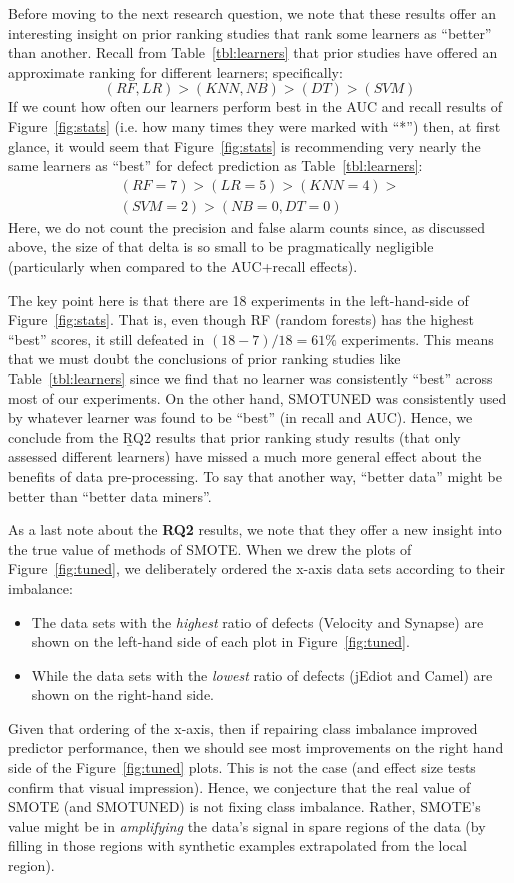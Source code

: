 \documentclass[10pt,conference]{IEEEtran}
\newcommand{\bi}{\begin{itemize}[leftmargin=0.4cm]}
\newcommand{\ei}{\end{itemize}}
\theoremstyle{break}
\theoremstyle{break}
\begin{document}
Before moving to the next research question, we note that these
 results offer an interesting insight on prior ranking studies that rank some learners
as ``better'' than another.
Recall from Table~\ref{tbl:learners} that prior studies have offered an approximate ranking for different learners; specifically:
\[
(\mathit{RF},\mathit{LR}) > (\mathit{KNN},\mathit{NB}) > (\mathit{DT}) > (\mathit{SVM})
\]
If we count how often our learners perform
best in the AUC and recall results of Figure~\ref{fig:stats} (i.e. how many times they were marked with ``*'') then, at first
glance, it would seem that Figure~\ref{fig:stats} is recommending very nearly the same
learners as ``best'' for defect prediction as   Table~\ref{tbl:learners}:
\[
\begin{array}{c}
(\mathit{RF}=7) > (\mathit{LR}=5) > (\mathit{KNN}=4) >\\
(\mathit{SVM}=2) > (\mathit{NB}=0, \mathit{DT}=0)
\end{array}
\]
Here, we do not count  the precision and false alarm counts since, as discussed above, the size
of that delta is so small to be pragmatically negligible (particularly when compared to the AUC+recall effects).

The key point here is that there are 18 experiments in the left-hand-side of Figure~\ref{fig:stats}. That is,
even though RF (random forests) has the highest  ``best'' scores, it still defeated in \mbox{$(18-7)/18=61\%$}
experiments. This means that we must doubt the conclusions of prior ranking studies like 
 Table~\ref{tbl:learners} since we find that no   learner was  consistently  ``best''  across most of our experiments.
On the other hand, 
  SMOTUNED was  consistently  used  by  whatever  learner  was  found  to  be ``best'' (in recall and AUC). 
Hence, we conclude from the {\b RQ2} results that  prior ranking study results (that only assessed different learners) have missed a much more general effect about the benefits of data pre-processing.
To say that another way, ``better data'' might be better than ``better data miners''.

As a last note about the {\bf RQ2} results, we note that they offer a new insight into
the true value of methods of SMOTE.
When we drew the plots of  Figure~\ref{fig:tuned}, we deliberately ordered
the x-axis data sets according to their imbalance:
\bi
\item
The data sets with the {\em highest} ratio of defects (Velocity and Synapse) are shown on the left-hand side of each plot in Figure~\ref{fig:tuned}.
\item
While the data sets with the {\em lowest} ratio of defects (jEdiot and Camel) are shown on the right-hand side.
\ei
Given that ordering of the x-axis, then if  repairing class imbalance  improved predictor performance, then 
we should see most improvements on the right hand side of the  Figure~\ref{fig:tuned} plots.
This is not the case (and effect size tests confirm that visual impression).
Hence, we conjecture that the   real value of SMOTE (and SMOTUNED) is not fixing class imbalance. Rather, SMOTE's
value might be in {\em amplifying} the data's signal in spare regions of the data (by filling
in those regions with synthetic examples extrapolated from the local region). 
\end{document}
